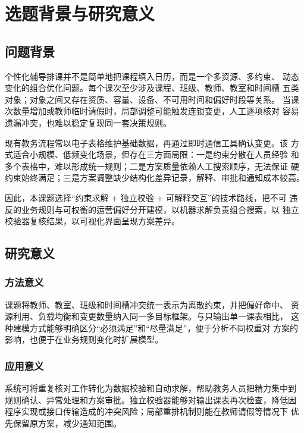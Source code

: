 \clearpage
\section{选题背景与研究意义}

\subsection{问题背景}

个性化辅导排课并不是简单地把课程填入日历，而是一个多资源、多约束、
动态变化的组合优化问题。每个课次至少涉及课程、班级、教师、教室和时间槽
五类对象；对象之间又存在资质、容量、设备、不可用时间和偏好时段等关系。
当课次数量增加或教师临时请假时，局部调整可能触发连锁变更，人工逐项核对
容易遗漏冲突，也难以稳定复现同一套决策规则。

现有教务流程常以电子表格维护基础数据，再通过即时通信工具确认变更。该
方式适合小规模、低频变化场景，但存在三方面局限：一是约束分散在人员经验
和多个表格中，难以形成统一规则；二是方案质量依赖人工搜索顺序，无法保证
硬约束始终满足；三是方案调整缺少结构化差异记录，解释、审批和通知成本较高。

因此，本课题选择“约束求解 + 独立校验 + 可解释交互”的技术路线，把不可
违反的业务规则与可权衡的运营偏好分开建模，以机器求解负责组合搜索，以
独立校验器复核结果，以可视化界面呈现方案差异。

\subsection{研究意义}

\subsubsection{方法意义}

课题将教师、教室、班级和时间槽冲突统一表示为离散约束，并把偏好命中、
资源利用、负载均衡和变更数量纳入同一多目标框架。与只输出单一课表相比，
这种建模方式能够明确区分“必须满足”和“尽量满足”，便于分析不同权重对
方案的影响，也便于在业务规则变化时扩展模型。

\subsubsection{应用意义}

系统可将重复核对工作转化为数据校验和自动求解，帮助教务人员把精力集中到
规则确认、异常处理和方案审批。独立校验器能够对输出课表再次检查，降低因
程序实现或接口传输造成的冲突风险；局部重排机制则能在教师请假等情况下
优先保留原方案，减少通知范围。

